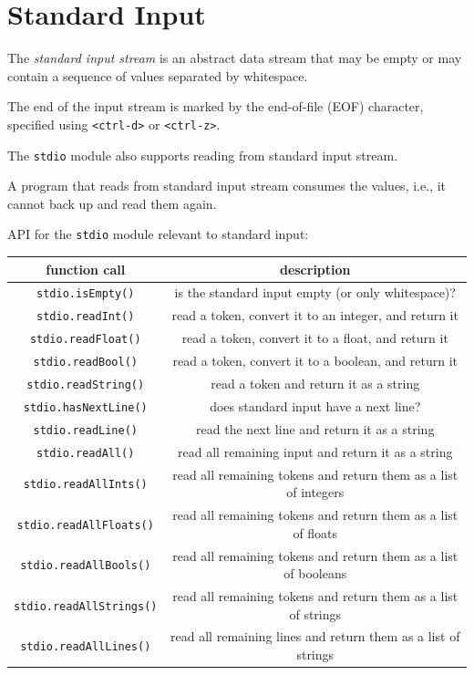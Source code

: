 \documentclass[8pt,a4paper,compress,handout]{beamer}
\begin{document}
\section{Standard Input}
\begin{frame}[fragile]
The \emph{standard input stream} is an abstract data stream that may be empty or may contain a sequence of values separated by whitespace. 

\bigskip

The end of the input stream is marked by the end-of-file (EOF) character, specified using \lstinline$<ctrl-d>$ or \lstinline$<ctrl-z>$. 

\bigskip

The \lstinline{stdio} module also supports reading from standard input stream.

\bigskip

A program that reads from standard input stream consumes the values, i.e., it cannot back up and read them again.
\end{frame}

\begin{frame}[fragile]
API for the \lstinline$stdio$ module relevant to standard input:
\begin{center}
\begin{tabular}{cc}
function call & description \\ \hline
\lstinline$stdio.isEmpty()$ & is the standard input empty (or only whitespace)? \\
\lstinline$stdio.readInt()$ & read a token, convert it to an integer, and return it \\
\lstinline$stdio.readFloat()$ & read a token, convert it to a float, and return it \\
\lstinline$stdio.readBool()$ & read a token, convert it to a boolean, and return it \\
\lstinline$stdio.readString()$ & read a token and return it as a string \\
\lstinline$stdio.hasNextLine()$ & does standard input have a next line? \\
\lstinline$stdio.readLine()$ & read the next line and return it as a string \\
\lstinline$stdio.readAll()$ & read all remaining input and return it as a string \\
\lstinline$stdio.readAllInts()$ & read all remaining tokens and return them as a list of integers \\
\lstinline$stdio.readAllFloats()$ & read all remaining tokens and return them as a list of floats \\
\lstinline$stdio.readAllBools()$ & read all remaining tokens and return them as a list of booleans \\
\lstinline$stdio.readAllStrings()$ & read all remaining tokens and return them as a list of strings \\
\lstinline$stdio.readAllLines()$ & read all remaining lines and return them as a list of strings
\end{tabular} 
\end{center}
\end{frame}
\end{document}
